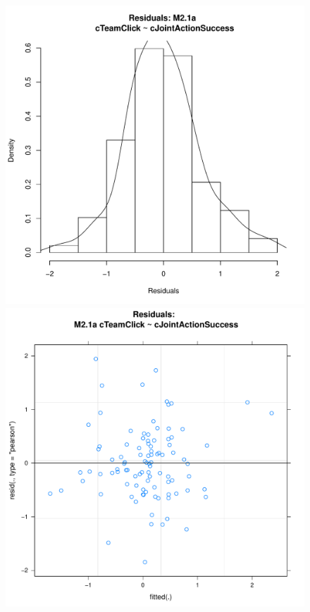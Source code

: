 {\begin{figure}[htbp]
  \includegraphics[scale =.4]{images/MLM21aHist.pdf}
  \includegraphics[scale =.4]{images/MLM21aScatter.pdf}

\end{figure}}
